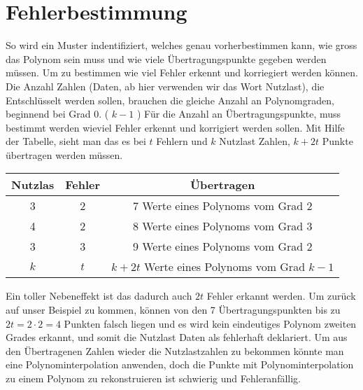 \section{Fehlerbestimmung
\label{reedsolomon:section:Fehlerbestimmmung}}
So wird ein Muster indentifiziert, welches genau vorherbestimmen kann,
wie gross das Polynom sein muss und wie viele Übertragungspunkte gegeben werden müssen.
Um zu bestimmen wie viel Fehler erkennt und korriegiert werden können.
Die Anzahl Zahlen (Daten, ab hier verwenden wir das Wort Nutzlast),
die Entschlüsselt werden sollen, brauchen die gleiche Anzahl an  Polynomgraden, beginnend bei Grad 0. ( \( k-1 \) )
Für die Anzahl an Übertragungspunkte, muss bestimmt werden wieviel Fehler erkennt und korrigiert werden sollen.
Mit Hilfe der Tabelle, sieht man das es bei $t$ Fehlern und $k$ Nutzlast Zahlen,
$k+2t$ Punkte übertragen werden müssen.

\begin{center}
    \begin{tabular}{ c c c } 
        \hline
        Nutzlas & Fehler & Übertragen \\
        \hline 
        3 & 2 & 7 Werte eines Polynoms vom Grad 2 \\ 
        4 & 2 & 8 Werte eines Polynoms vom Grad 3 \\
        3 & 3 & 9 Werte eines Polynoms vom Grad 2 \\ 
        \hline
        $k$ & $t$ & $k+2t$ Werte eines Polynoms vom Grad $k-1$ \\ 
        \hline
    \end{tabular}
\end{center}

Ein toller Nebeneffekt ist das dadurch auch $2t$ Fehler erkannt werden. 
Um zurück auf unser Beispiel zu kommen, 
können von den 7 Übertragungspunkten bis zu $2t = 2\cdot2 = 4 $ Punkten falsch liegen 
und es wird kein eindeutiges Polynom zweiten Grades erkannt, und somit die Nutzlast Daten als fehlerhaft deklariert.
Um aus den Übertragenen Zahlen wieder die Nutzlastzahlen zu bekommen könnte man eine Polynominterpolation anwenden,
doch die Punkte mit Polynominterpolation zu einem Polynom zu rekonstruieren ist schwierig und Fehleranfällig.

